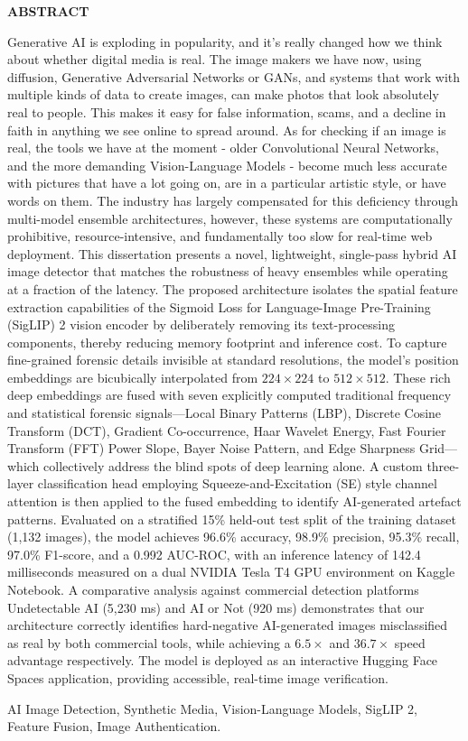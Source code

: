 \thispagestyle{plain}

\begin{center}
	{\Large \bf ABSTRACT}
\end{center}

Generative AI is exploding in popularity, and it’s really changed how we think about whether digital media is real. The image makers we have now, using diffusion, Generative Adversarial Networks or GANs, and systems that work with multiple kinds of data to create images, can make photos that look absolutely real to people. This makes it easy for false information, scams, and a decline in faith in anything we see online to spread around. As for checking if an image is real, the tools we have at the moment - older Convolutional Neural Networks, and the more demanding Vision-Language Models - become much less accurate with pictures that have a lot going on, are in a particular artistic style, or have words on them. The industry has largely compensated for this deficiency through multi-model ensemble architectures, however, these systems are computationally prohibitive, resource-intensive, and fundamentally too slow for real-time web deployment. This dissertation presents a novel, lightweight, single-pass hybrid AI image detector that matches the robustness of heavy ensembles while operating at a fraction of the latency. The proposed architecture isolates the spatial feature extraction capabilities of the Sigmoid Loss for Language-Image Pre-Training (SigLIP) 2 vision encoder by deliberately removing its text-processing components, thereby reducing memory footprint and inference cost. To capture fine-grained forensic details invisible at standard resolutions, the model's position embeddings are bicubically interpolated from $224 \times 224$ to $512 \times 512$. These rich deep embeddings are fused with seven explicitly computed traditional frequency and statistical forensic signals---Local Binary Patterns (LBP), Discrete Cosine Transform (DCT), Gradient Co-occurrence, Haar Wavelet Energy, Fast Fourier Transform (FFT) Power Slope, Bayer Noise Pattern, and Edge Sharpness Grid---which collectively address the blind spots of deep learning alone. A custom three-layer classification head employing Squeeze-and-Excitation (SE) style channel attention is then applied to the fused embedding to identify AI-generated artefact patterns. Evaluated on a stratified 15\% held-out test split of the training dataset (1,132 images), the model achieves 96.6\% accuracy, 98.9\% precision, 95.3\% recall, 97.0\% F1-score, and a 0.992 AUC-ROC, with an inference latency of 142.4 milliseconds measured on a dual NVIDIA Tesla T4 GPU environment on Kaggle Notebook. A comparative analysis against commercial detection platforms Undetectable AI (5,230 ms) and AI or Not (920 ms) demonstrates that our architecture correctly identifies hard-negative AI-generated images misclassified as real by both commercial tools, while achieving a $6.5\times$ and $36.7\times$ speed advantage respectively. The model is deployed as an interactive Hugging Face Spaces application, providing accessible, real-time image verification.

\begin{keywords}
	AI Image Detection, Synthetic Media, Vision-Language Models, SigLIP 2, Feature Fusion, Image Authentication.
\end{keywords}

\clearpage
